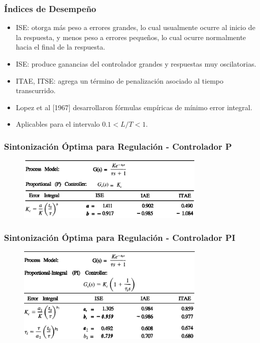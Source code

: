 \documentclass[aspectratio=169]{beamer}
\theoremstyle{definition}
\theoremstyle{plain}
\theoremstyle{remark}
\begin{document}
\begin{frame}[<+->]\frametitle{Índices de Desempeño}
	\begin{itemize}
		\item ISE: otorga más peso a errores grandes, lo cual usualmente ocurre al inicio de la respuesta, y menos peso a errores pequeños, lo cual ocurre normalmente hacia el final de la respuesta.
		\item ISE: produce ganancias del controlador grandes y respuestas muy oscilatorias.
		\item ITAE, ITSE: agrega un término de penalización asociado al tiempo transcurrido.
		\item Lopez et al [1967] desarrollaron fórmulas empíricas de mínimo error integral.
		\item Aplicables para el intervalo $0.1 < L/T < 1$.
	\end{itemize}
\end{frame}

\begin{frame}[<+->]\frametitle{Sintonización Óptima para Regulación - Controlador P}
\begin{figure}
	\includegraphics[width=9cm]{images/criteriosOptimosP.eps}
\end{figure}
\end{frame}

\begin{frame}[<+->]\frametitle{Sintonización Óptima para Regulación - Controlador PI}
\begin{figure}
	\includegraphics[width=9cm]{images/criteriosOptimosPI.eps}
\end{figure}
\end{frame}
\end{document}
